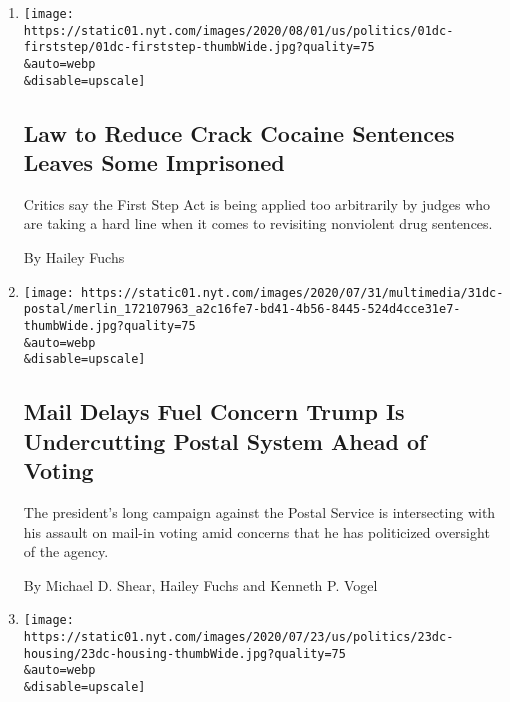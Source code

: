 \begin{enumerate}
\def\labelenumi{\arabic{enumi}.}
\item
  \href{/2020/08/01/us/politics/law-to-reduce-crack-cocaine-sentences-leaves-some-imprisoned.html}{}

  \texttt{[image: https://static01.nyt.com/images/2020/08/01/us/politics/01dc-firststep/01dc-firststep-thumbWide.jpg?quality=75\\\&auto=webp\\\&disable=upscale]}

  \hypertarget{law-to-reduce-crack-cocaine-sentences-leaves-some-imprisoned}{%
  \subsection{Law to Reduce Crack Cocaine Sentences Leaves Some
  Imprisoned}\label{law-to-reduce-crack-cocaine-sentences-leaves-some-imprisoned}}

  Critics say the First Step Act is being applied too arbitrarily by
  judges who are taking a hard line when it comes to revisiting
  nonviolent drug sentences.

  By Hailey Fuchs
\item
  \href{/2020/07/31/us/politics/trump-usps-mail-delays.html}{}

  \texttt{[image: https://static01.nyt.com/images/2020/07/31/multimedia/31dc-postal/merlin\_172107963\_a2c16fe7-bd41-4b56-8445-524d4cce31e7-thumbWide.jpg?quality=75\\\&auto=webp\\\&disable=upscale]}

  \hypertarget{mail-delays-fuel-concern-trump-is-undercutting-postal-system-ahead-of-voting}{%
  \subsection{Mail Delays Fuel Concern Trump Is Undercutting Postal
  System Ahead of
  Voting}\label{mail-delays-fuel-concern-trump-is-undercutting-postal-system-ahead-of-voting}}

  The president's long campaign against the Postal Service is
  intersecting with his assault on mail-in voting amid concerns that he
  has politicized oversight of the agency.

  By Michael D. Shear, Hailey Fuchs and Kenneth P. Vogel
\item
  \href{/2020/07/23/us/politics/trump-housing-discrimination-suburbs.html}{}

  \texttt{[image: https://static01.nyt.com/images/2020/07/23/us/politics/23dc-housing/23dc-housing-thumbWide.jpg?quality=75\\\&auto=webp\\\&disable=upscale]}


\end{enumerate}

